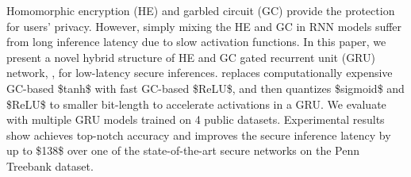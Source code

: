Homomorphic encryption (HE) and garbled circuit (GC) provide the protection for users' privacy. However, simply mixing the HE and GC in RNN models suffer from long inference latency due to slow activation functions. In this paper, we present a novel hybrid structure of HE and GC gated recurrent unit (GRU) network, \cryptogru, for low-latency secure inferences. \cryptogru replaces computationally expensive GC-based \$tanh\$ with fast GC-based \$ReLU\$, and then quantizes \$sigmoid\$ and \$ReLU\$ to smaller bit-length to accelerate activations in a GRU. We evaluate \cryptogru with multiple GRU models trained on 4 public datasets. Experimental results show \cryptogru achieves top-notch accuracy and improves the secure inference latency by up to \$138\times\$ over one of the state-of-the-art secure networks on the Penn Treebank dataset.

